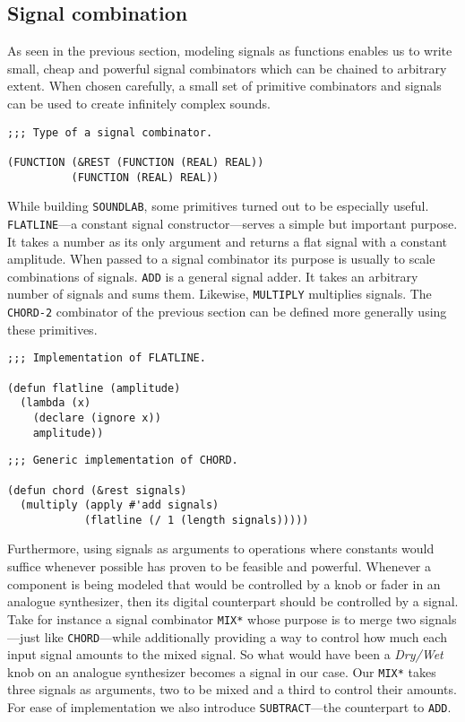 \subsection{Signal combination}

As seen in the previous section, modeling signals as functions
enables us to write small, cheap and powerful signal combinators which
can be chained to arbitrary extent. When chosen carefully, a small set of
primitive combinators and signals can be used to create infinitely
complex sounds.

\begin{verbatim}
;;; Type of a signal combinator.

(FUNCTION (&REST (FUNCTION (REAL) REAL))
          (FUNCTION (REAL) REAL))
\end{verbatim}

While building \texttt{SOUNDLAB}, some primitives turned out to be
especially useful. \texttt{FLATLINE}---a constant signal
constructor---serves a simple but important purpose. It takes a number as
its only argument and returns a flat signal with a constant
amplitude. When passed to a signal combinator its purpose is usually to
scale combinations of signals. \texttt{ADD} is a general signal adder. It
takes an arbitrary number of signals and sums them. Likewise,
\texttt{MULTIPLY} multiplies signals. The \texttt{CHORD-2} combinator of
the previous section can be defined more generally using these primitives.

\begin{verbatim}
;;; Implementation of FLATLINE.

(defun flatline (amplitude)
  (lambda (x)
    (declare (ignore x))
    amplitude))
\end{verbatim}

\begin{verbatim}
;;; Generic implementation of CHORD.

(defun chord (&rest signals)
  (multiply (apply #'add signals)
            (flatline (/ 1 (length signals)))))
\end{verbatim}

Furthermore, using signals as arguments to operations where constants
would suffice whenever possible has proven to be feasible and powerful.
Whenever a component is being modeled that would be controlled by a knob
or fader in an analogue synthesizer, then its digital counterpart should
be controlled by a signal. Take for instance a signal combinator
\texttt{MIX*} whose purpose is to merge two signals---just like
\texttt{CHORD}---while additionally providing a way to control how much
each input signal amounts to the mixed signal. So what would have been a
\textit{Dry/Wet} knob on an analogue synthesizer becomes a signal in our
case. Our \texttt{MIX*} takes three signals as arguments, two to be mixed
and a third to control their amounts. For ease of implementation we also
introduce \texttt{SUBTRACT}---the counterpart to \texttt{ADD}.

